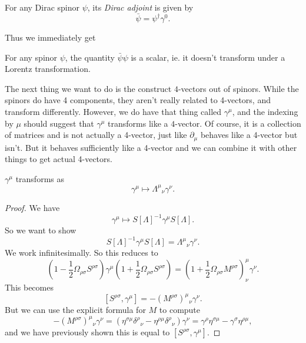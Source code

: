 \documentclass[a4paper]{article}
\begin{document}
\begin{defi}
  For any Dirac spinor $\psi$, its \emph{Dirac adjoint} is given by
  \[
    \bar\psi = \psi^\dagger \gamma^0.
  \]
\end{defi}
Thus we immediately get
\begin{cor}
  For any spinor $\psi$, the quantity $\bar \psi \psi$ is a scalar, ie. it doesn't transform under a Lorentz transformation.
\end{cor}

The next thing we want to do is the construct $4$-vectors out of spinors. While the spinors do have 4 components, they aren't really related to 4-vectors, and transform differently. However, we do have that thing called $\gamma^\mu$, and the indexing by $\mu$ should suggest that $\gamma^\mu$ transforms like a $4$-vector. Of course, it is a collection of matrices and is not actually a 4-vector, just like $\partial_\mu$ behaves like a 4-vector but isn't. But it behaves sufficiently like a 4-vector and we can combine it with other things to get actual 4-vectors.


\begin{prop}
  $\gamma^\mu$ transforms as
  \[
    \gamma^\mu \mapsto \Lambda^\mu\!_\nu \gamma^\nu.
  \]
\end{prop}

\begin{proof}
  We have
  \[
    \gamma^\mu \mapsto S[\Lambda]^{-1} \gamma^\mu S[\Lambda].
  \]
  So we want to show
  \[
    S[\Lambda]^{-1} \gamma^\mu S[\Lambda] = \Lambda^\mu\!_\nu \gamma^\nu.
  \]
  We work infinitesimally. So this reduces to
  \[
    \left(1 - \frac{1}{2} \Omega_{\rho\sigma} S^{\rho\sigma}\right) \gamma^\mu \left(1 + \frac{1}{2} \Omega_{\rho\sigma}S^{\rho\sigma}\right) = \left(1 + \frac{1}{2}\Omega_{\rho\sigma}M^{\rho\sigma}\right)^\mu_\nu\gamma^\nu.
  \]
  This becomes
  \[
    [S^{\rho\sigma}, \gamma^\mu] = -(M^{\rho\sigma})^\mu\!_\nu\gamma^\nu.
  \]
  But we can use the explicit formula for $M$ to compute
  \[
    -(M^{\rho\sigma})^\mu\!_\nu \gamma^\nu = (\eta^{\sigma\mu} \delta^\rho\!_\nu - \eta^{\rho\mu}\delta^\rho\!_\nu) \gamma^\nu = \gamma^\rho\eta^{\sigma\mu} - \gamma^\sigma\eta^{\rho\mu},
  \]
  and we have previously shown this is equal to $[S^{\rho\sigma}, \gamma^\mu]$.
\end{proof}
\end{document}
